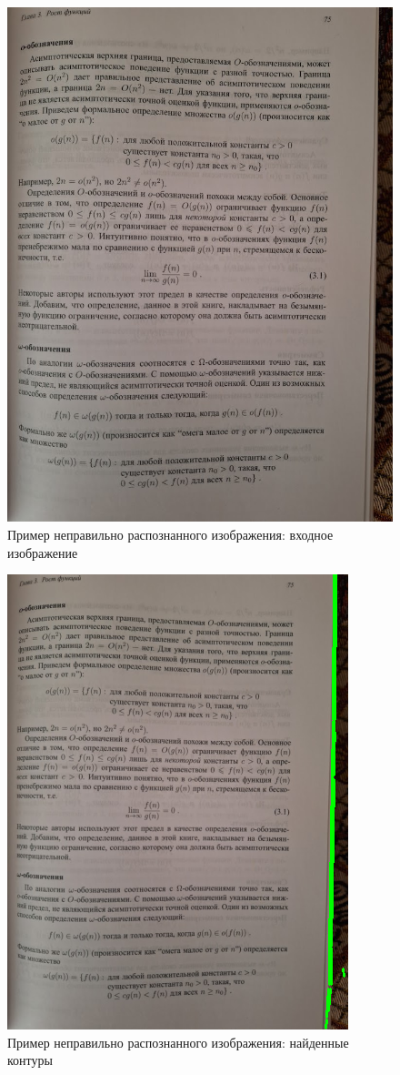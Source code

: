 \begin{figure}
    \includegraphics[scale=0.5]{img/perspective/wrong_input.jpg}
    \caption{Пример неправильно распознанного изображения: входное изображение}
    \label{perspective_wrong_input}
\end{figure}

\begin{figure}
    \includegraphics[scale=0.75]{img/perspective/wrong_output.png}
    \caption{Пример неправильно распознанного изображения: найденные контуры}
    \label{perspective_wrong_output}
\end{figure}